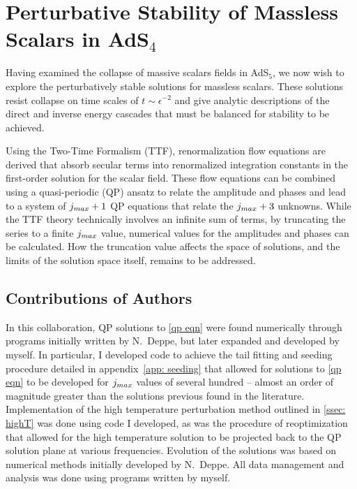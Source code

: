 \documentclass[../PhD.tex]{subfiles}
\begin{document}

\chapter{Perturbative Stability of Massless Scalars in AdS$_4$}
\label{ch: ttf}

Having examined the collapse of massive scalars fields in AdS$_5$, we now wish to explore the perturbatively stable solutions for massless scalars. These solutions resist collapse on time scales of $t \sim \epsilon^{-2}$ and give analytic descriptions of the direct and inverse energy cascades that must be balanced for stability to be achieved.

Using the Two-Time Formalism (TTF), renormalization flow equations are derived that absorb secular terms into renormalized integration constants in the first-order solution for the scalar field. These flow equations can be combined using a quasi-periodic (QP) ansatz to relate the amplitude and phases and lead to a system of $j_{max} + 1$ QP equations that relate the $j_{max} + 3$ unknowns. While the TTF theory technically involves an infinite sum of terms, by truncating the series to a finite $j_{max}$ value, numerical values for the amplitudes and phases can be calculated. How the truncation value affects the space of solutions, and the limits of the solution space itself, remains to be addressed.

\section{Contributions of Authors}

In this collaboration, QP solutions to \eqref{qp eqn} were found numerically through programs initially written by N.~Deppe, but later expanded and developed by myself. In particular, I developed code to achieve the tail fitting and seeding procedure detailed in appendix~\ref{app: seeding} that allowed for solutions to \eqref{qp eqn} to be developed for $j_{max}$ values of several hundred -- almost an order of magnitude greater than the solutions previous found in the literature. Implementation of the high temperature perturbation method outlined in \ref{ssec: highT} was done using code I developed, as was the procedure of reoptimization that allowed for the high temperature solution to be projected back to the QP solution plane at various frequencies. Evolution of the solutions was based on numerical methods initially developed by N.~Deppe. All data management and analysis was done using programs written by myself.
\end{document}
